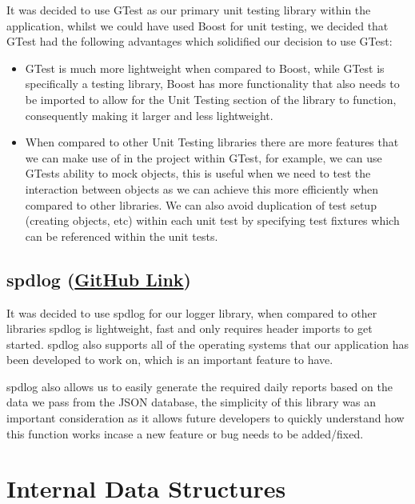 \documentclass[
  english,
  a4paper,
,tablecaptionabove
]{scrartcl}
\providecommand{\tightlist}{%
  \setlength{\itemsep}{0pt}\setlength{\parskip}{0pt}}
\begin{document}
It was decided to use GTest as our primary unit testing library within
the application, whilst we could have used Boost for unit testing, we
decided that GTest had the following advantages which solidified our
decision to use GTest:

\begin{itemize}
\tightlist
\item
  GTest is much more lightweight when compared to Boost, while GTest is
  specifically a testing library, Boost has more functionality that also
  needs to be imported to allow for the Unit Testing section of the
  library to function, consequently making it larger and less
  lightweight.
\item
  When compared to other Unit Testing libraries there are more features
  that we can make use of in the project within GTest, for example, we
  can use GTests ability to mock objects, this is useful when we need to
  test the interaction between objects as we can achieve this more
  efficiently when compared to other libraries. We can also avoid
  duplication of test setup (creating objects, etc) within each unit
  test by specifying test fixtures which can be referenced within the
  unit tests.
\end{itemize}

\hypertarget{spdlog-github-link}{%
\subsection{\texorpdfstring{spdlog
(\href{https://github.com/gabime/spdlog}{GitHub
Link})}{spdlog (GitHub Link)}}\label{spdlog-github-link}}

It was decided to use spdlog for our logger library, when compared to
other libraries spdlog is lightweight, fast and only requires header
imports to get started. spdlog also supports all of the operating
systems that our application has been developed to work on, which is an
important feature to have.

spdlog also allows us to easily generate the required daily reports
based on the data we pass from the JSON database, the simplicity of this
library was an important consideration as it allows future developers to
quickly understand how this function works incase a new feature or bug
needs to be added/fixed.

\newpage

\hypertarget{internal-data-structures}{%
\section{Internal Data Structures}\label{internal-data-structures}}
\end{document}
